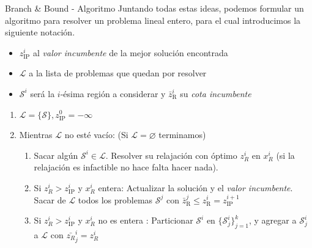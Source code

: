 \documentclass[10pt, aspectratio=169]{beamer}
\begin{document}
\begin{frame}{Branch \& Bound - Algoritmo}
Juntando todas estas ideas, podemos formular un algoritmo para resolver un problema lineal entero, para el cual introducimos la siguiente notaci\'on.
\pause
\begin{itemize}
	\item $z_{\text{IP}}^i$ al \textsl{valor incumbente} de la mejor soluci\'on encontrada 
	\item $\mathcal{L}$ a la lista de problemas que quedan por resolver
	\item $\mathcal{S}^i$ ser\'a la $i$-\'esima regi\'on a considerar y $\bar{z}_{\text{R}}^i$ su \textsl{cota incumbente}
\end{itemize}
\pause
\begin{enumerate}
	\item $\mathcal{L} = \{\mathcal{S}\}, z_{\text{IP}}^0 = -\infty$
	
\item Mientras $\mathcal{L}$ no est\'e vac\'io: (Si $\mathcal{L} = \varnothing$ terminamos)

\begin{enumerate}
		\item { Sacar alg\'un $\mathcal{S}^i \in \mathcal{L}$}. Resolver su relajaci\'on con \'optimo $z_R^i$ en $x_R^i$ (si la relajaci\'on es infactible no hace falta hacer nada).
		\item Si $z_R^i > z_{\text{IP}}^i$ y $x_R^i$ entera: Actualizar la soluci\'on y el \textsl{valor incumbente}. Sacar de $\mathcal{L}$ todos los problemas $\mathcal{S}^j$ con $\bar{z}_{\text{R}}^j \leq z_{\text{R}}^i = z_{\text{IP}}^{i+1}$
		\item Si $z_R^i > z_{\text{IP}}^i$ y $x_R^i$ no es entera : { Particionar $\mathcal{S}^i$} en $\{ \mathcal{S}_j^i \}_{j = 1}^k$, y agregar a $\mathcal{S}_j^i$ a $\mathcal{L}$ con  $\bar{z_R}_j^i = z_R^i$

\end{enumerate}

\end{enumerate}

\end{frame}
\end{document}
